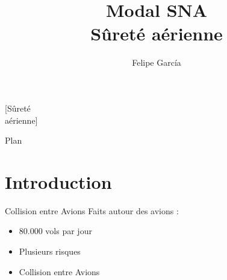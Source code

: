 \documentclass{beamer} %
\begin{document}
	
	\title[Felipe García]{Modal SNA  \\ Sûreté aérienne}[Sûreté\\ aérienne]
	\author[]{Felipe García}
		
	\maketitle
	
	\begin{frame}[t]{Plan}
		\tableofcontents
	\end{frame}
	
	\section{Introduction} %
	\label{sec:introduction}
	
	
	\begin{frame}[t]{Collision entre Avions}
		Faits autour des avions : 
		\begin{itemize}
			\item<+-> 80.000 vols par jour
			\item<+-> Plusieurs risques
			\item<+-> Collision entre Avions
		\end{itemize}
		
		
		
	\end{frame}
	
\end{document}
